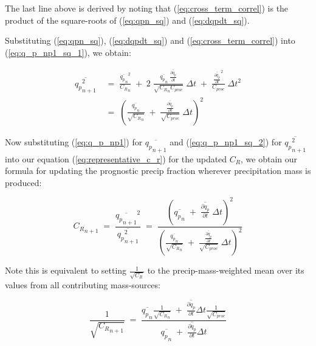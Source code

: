 \documentclass{UMDP_article}
\begin{document}
The last line above is derived by noting that (\ref{eq:cross_term_correl})
is the product of the square-roots of
(\ref{eq:qpn_sq}) and (\ref{eq:dqpdt_sq}).

Substituting (\ref{eq:qpn_sq}), (\ref{eq:dqpdt_sq}) and
(\ref{eq:cross_term_correl}) into (\ref{eq:q_p_np1_sq_1}), we obtain:

\begin{align}
\overline{{q_p}_{n+1}^2}
& \; = \; \frac{ \overline{{q_p}_n}^2 }{ {C_R}_n }
   \; + \; 2 \; \frac{ \overline{ {q_p}_n } \;
                       \overline{ \frac{\partial q_p}{\partial t} } }
                     { \sqrt{ {C_R}_n C_{proc} } } \; \Delta t
   \; + \; \frac{ \overline{\frac{\partial q_p}{\partial t}}^2 }{ C_{proc} }
        \; \Delta t^2
\nonumber \\
& \; = \; \left( \frac{ \overline{{q_p}_n} }{ \sqrt{ {C_R}_n } }
          \; + \; \frac{ \overline{\frac{\partial q_p}{\partial t}} }
                       { \sqrt{ C_{proc} } } \; \Delta t
          \right)^2
\label{eq:q_p_np1_sq_2}
\end{align}

Now substituting (\ref{eq:q_p_np1}) for $\overline{{q_p}_{n+1}}$ and
 (\ref{eq:q_p_np1_sq_2}) for $\overline{{q_p}_{n+1}^2}$
into our equation (\ref{eq:representative_c_r}) for the updated $C_R$,
we obtain our formula for updating the prognostic precip fraction wherever
precipitation mass is produced:

\begin{equation} \label{eq:cr_np1}
{C_R}_{n+1} \; = \;
  \frac{ \overline{{q_p}_{n+1}}^2 }{ \overline{{q_p}_{n+1}^2} }
\; = \;
  \frac{ \left( \overline{ {q_p}_n }
        \; + \; \overline{ \frac{\partial q_p}{\partial t} } \; \Delta t
         \right)^2 }
       { \left( \frac{ \overline{{q_p}_n} }{ \sqrt{ {C_R}_n } }
          \; + \; \frac{ \overline{\frac{\partial q_p}{\partial t}} }
                       { \sqrt{ C_{proc} } } \; \Delta t
          \right)^2 }
\end{equation}

Note this is equivalent to setting $\frac{1}{\sqrt{C_R}}$ to the
precip-mass-weighted mean over its values from all contributing mass-sources:

\[
\frac{1}{\sqrt{{C_R}_{n+1}}} \; = \;
  \frac{ \overline{{q_p}_n} \frac{1}{\sqrt{{C_R}_n}} \; + \;
         \overline{\frac{\partial q_p}{\partial t}} \Delta t
                           \frac{1}{\sqrt{C_{proc}}} }
       { \overline{{q_p}_n} \; + \;
         \overline{\frac{\partial q_p}{\partial t}} \Delta t }
\]
\end{document}
